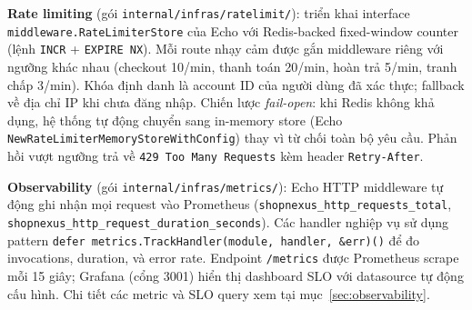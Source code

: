\textbf{Rate limiting} (gói \texttt{internal/infras/ratelimit/}): triển khai interface \texttt{middleware.RateLimiterStore} của Echo với Redis-backed fixed-window counter (lệnh \texttt{INCR} + \texttt{EXPIRE NX}). Mỗi route nhạy cảm được gắn middleware riêng với ngưỡng khác nhau (checkout 10/min, thanh toán 20/min, hoàn trả 5/min, tranh chấp 3/min). Khóa định danh là account ID của người dùng đã xác thực; fallback về địa chỉ IP khi chưa đăng nhập. Chiến lược \textit{fail-open}: khi Redis không khả dụng, hệ thống tự động chuyển sang in-memory store (Echo \texttt{NewRateLimiterMemoryStoreWithConfig}) thay vì từ chối toàn bộ yêu cầu. Phản hồi vượt ngưỡng trả về \texttt{429 Too Many Requests} kèm header \texttt{Retry-After}.

\textbf{Observability} (gói \texttt{internal/infras/metrics/}): Echo HTTP middleware tự động ghi nhận mọi request vào Prometheus (\texttt{shopnexus\_http\_requests\_total}, \texttt{shopnexus\_http\_request\_duration\_seconds}). Các handler nghiệp vụ sử dụng pattern \texttt{defer metrics.TrackHandler(module, handler, \&err)()} để đo invocations, duration, và error rate. Endpoint \texttt{/metrics} được Prometheus scrape mỗi 15 giây; Grafana (cổng 3001) hiển thị dashboard SLO với datasource tự động cấu hình. Chi tiết các metric và SLO query xem tại mục~\ref{sec:observability}.
